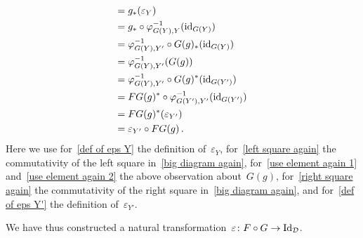 \begin{remark}
\begin{enumerate}
\begin{align}
        ={}&  g_*( \varepsilon_Y )  \notag  \\
        ={}&  g_* \circ \varphi_{G(Y),Y}^{-1}( \mathrm{id}_{G(Y)} ) \label{def of eps Y}  \\
        ={}&  \varphi_{G(Y),Y'}^{-1} \circ G(g)_*( \mathrm{id}_{G(Y)} ) \label{left square again} \\
        ={}&  \varphi_{G(Y),Y'}^{-1}( G(g) )  \label{use element again 1} \\
        ={}&  \varphi_{G(Y),Y'}^{-1} \circ G(g)^*( \mathrm{id}_{G(Y')} )  \label{use element again 2} \\
        ={}&  FG(g)^* \circ \varphi_{G(Y'),Y'}^{-1}( \mathrm{id}_{G(Y')} )  \label{right square again}  \\
        ={}&  FG(g)^*( \varepsilon_{Y'} ) \label{def of eps Y'} \\
        ={}&  \varepsilon_{Y'} \circ FG(g)  \notag  \,.
      \end{align}
      Here we use for~\eqref{def of eps Y} the definition of~$\varepsilon_Y$, for~\eqref{left square again} the commutativity of the left square in~\eqref{big diagram again}, for~\eqref{use element again 1} and~\eqref{use element again 2} the above observation about~$G(g)$, for~\eqref{right square again} the commutativity of the right square in~\eqref{big diagram again}, and for~\eqref{def of eps Y'} the definition of~$\varepsilon_{Y'}$.
      
      We have thus constructed a natural transformation~$\varepsilon \colon F \circ G \to \mathrm{Id}_{\mathcal{D}}$.
  \end{enumerate}
  
\end{remark}


















